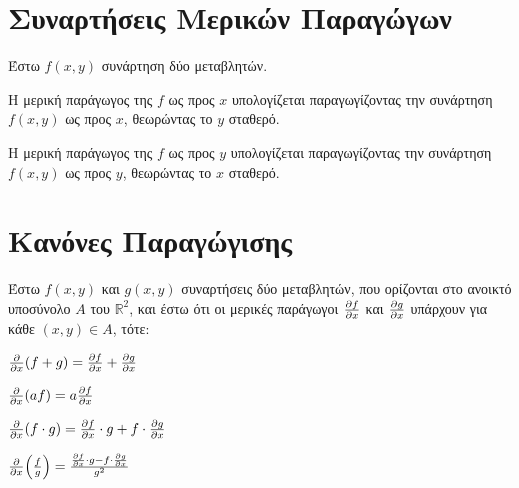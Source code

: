 \section{Συναρτήσεις Μερικών Παραγώγων}

Έστω $ f(x,y) $ συνάρτηση δύο μεταβλητών. 
\begin{myitemize}
    \item Η μερική παράγωγος της $f$ ως προς $x$ υπολογίζεται παραγωγίζοντας 
        την συνάρτηση $ f(x,y) $ ως προς $x$, θεωρώντας το $y$ σταθερό. 
    \item Η μερική παράγωγος της $f$ ως προς $y$ υπολογίζεται παραγωγίζοντας 
        την συνάρτηση $ f(x,y) $ ως προς $y$, θεωρώντας το $x$ σταθερό. 
\end{myitemize}

\section{Κανόνες Παραγώγισης}

Έστω $ f(x,y) $ και $ g(x,y) $ συναρτήσεις δύο μεταβλητών, που ορίζονται στο 
ανοικτό υποσύνολο $ A $ του $ \mathbb{R}^{2} $, και έστω ότι οι μερικές παράγωγοι 
$ \pdv{f}{x} $ και $ \pdv{g}{x} $ υπάρχουν για κάθε $ (x,y) \in A $, τότε:
\begin{myitemize}
    \item $ \pdv{x}(f+g) = \pdv{f}{x} + \pdv{g}{x} $
    \item $ \pdv{x}(af) = a \pdv{f}{x} $ 
    \item $ \pdv{x}(f\cdot g) = \pdv{f}{x} \cdot g + f \cdot \pdv{g}{x} $
    \item $ \pdv{x}(\frac{f}{g}) = \frac{\pdv{f}{x} \cdot g - f \cdot 
        \pdv{g}{x}}{g^{2}} $
\end{myitemize}

